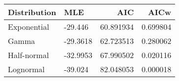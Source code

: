 \begin{tabular}{llrr}
\toprule
Distribution &      MLE &        AIC &      AICw \\
\midrule
 Exponential &  -29.446 &  60.891934 &  0.699804 \\
       Gamma & -29.3618 &  62.723513 &  0.280062 \\
 Half-normal & -32.9953 &  67.990502 &  0.020116 \\
   Lognormal &  -39.024 &  82.048053 &  0.000018 \\
\bottomrule
\end{tabular}
